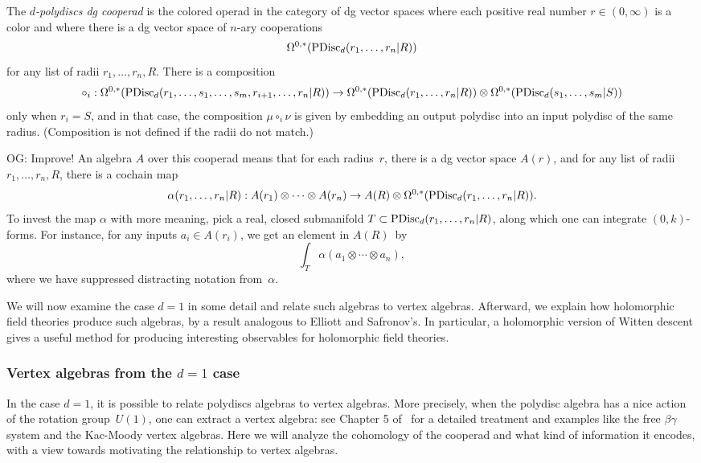 \documentclass[11pt]{amsart}
\def\owen#1{{\textcolor{violet!65!black}{OG: {#1}}}}
\begin{document}
\begin{dfn}
\label{dfn pdisc}
The {\em $d$-polydiscs dg cooperad} is the colored operad in the category of dg vector spaces where each positive real number $r \in (0,\infty)$ is a color 
and where there is a dg vector space of $n$-ary cooperations
\[
\Omega^{0,*}({\rm PDisc}_d(r_1, \ldots, r_n| R)) 
\]
for any list of radii $r_1,\ldots, r_n, R$.
There is a composition
\[
\circ_i: \Omega^{0,*}({\rm PDisc}_d(r_1, \ldots, s_1, \ldots, s_m, r_{i+1}, \ldots, r_n| R))\to \Omega^{0,*}({\rm PDisc}_d(r_1, \ldots, r_n| R)) \otimes \Omega^{0,*}({\rm PDisc}_d(s_1, \ldots, s_m| S))
\]
only when $r_i = S$, 
and in that case, the composition $\mu \circ_i \nu$ is given by embedding an output polydisc into an input polydisc of the same radius.
(Composition is not defined if the radii do not match.)
\end{dfn}

\owen{Improve!}
An algebra $A$ over this cooperad means that for each radius~$r$, 
there is a dg vector space $A(r)$, and for any list of radii $r_1,\ldots, r_n, R$,
there is a cochain map
\[
\alpha(r_1, \ldots, r_n| R): A(r_1) \otimes \cdots \otimes A(r_n) \to A(R) \otimes \Omega^{0,*}({\rm PDisc}_d(r_1, \ldots, r_n| R)) .
\]
To invest the map $\alpha$ with more meaning, 
pick a real, closed submanifold $T \subset {\rm PDisc}_d(r_1, \ldots, r_n| R)$, along which one can integrate $(0,k)$-forms.
For instance, for any inputs $a_i \in A(r_i)$, we get an element in $A(R)$~by
\[
\int_T \alpha(a_1 \otimes \cdots \otimes a_n),
\]
where we have suppressed distracting notation from~$\alpha$.

We will now examine the case $d=1$ in some detail and relate such algebras to vertex algebras.
Afterward, we explain how holomorphic field theories produce such algebras,
by a result analogous to Elliott and Safronov's.
In particular, a holomorphic version of Witten descent gives a useful method for producing interesting observables for holomorphic field theories.

\subsubsection{Vertex algebras from the $d=1$ case}

In the case $d=1$, it is possible to relate polydiscs algebras to vertex algebras.
More precisely, when the polydisc algebra has a nice action of the rotation group~$U(1)$,
one can extract a vertex algebra: 
see Chapter 5 of~\cite{CG1} for a detailed treatment and examples like the free $\beta\gamma$ system and the Kac-Moody vertex algebras.
Here we will analyze the cohomology of the cooperad and what kind of information it encodes, with a view towards motivating the relationship to vertex algebras.
\end{document}
